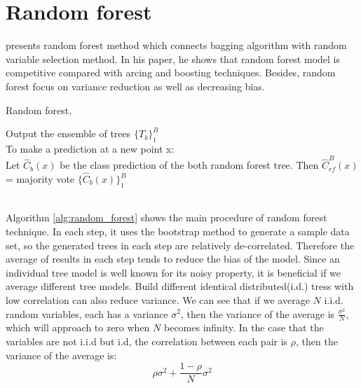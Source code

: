 \section{Random forest}
\cite{breiman2001random} presents random forest method which connects bagging algorithm with random variable selection method. In his paper,  he shows that random forest model is competitive compared with arcing and boosting techniques. Besides,  random forest focus on variance reduction as well as decreasing bias. \\

\begin{algorithm}[H]
	\caption{Random forest,  \cite{breiman2001random}}\label{alg:random_forest}
	\nl {}
	\nl Output the ensemble of trees $\{T_b\}_1^B$ \\
	To make a prediction at a new point x:\\
	\nl Let $\hat{C}_b(x)$ be the class prediction of the both random forest tree. Then $\hat{C}_{rf}^B(x)$= majority vote $\{\hat{C}_b(x)\}_1^{B}$
\end{algorithm} 
\\

Algorithm \ref{alg:random_forest} shows the main procedure of random forest technique. In each step,  it uses the bootstrap method to generate a sample data set,  so the generated trees in each step are relatively de-correlated. Therefore the average of results in each step tends to reduce the bias of the model. Since an individual tree model is well known for its noisy property,  it is beneficial if we average different tree models. Build different identical distributed(i.d.) tress with low correlation can also reduce variance.  We can see that if we average $N$ i.i.d. random variables, each has a variance $\sigma^2$,  then the variance of the average is $\frac{\sigma^2}{N}$,  which will approach to zero when $N$ becomes infinity. In the case that the variables are not i.i.d but i.d,  the correlation between each pair is $\rho$,  then the variance of the average is:
\begin{equation}
\rho\sigma^2 +\frac{1-\rho}{N}\sigma^2
\end{equation} 

